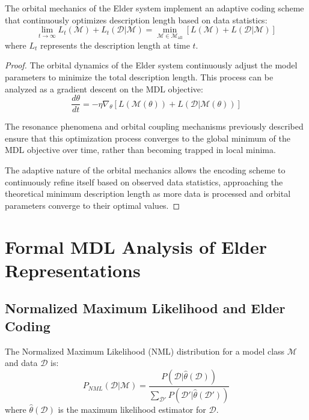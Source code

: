 \begin{theorem}
The orbital mechanics of the Elder system implement an adaptive coding scheme that continuously optimizes description length based on data statistics:
\begin{equation}
\lim_{t \to \infty} L_t(\mathcal{M}) + L_t(\mathcal{D} | \mathcal{M}) = \min_{\mathcal{M} \in \mathcal{M}_{\text{all}}} [L(\mathcal{M}) + L(\mathcal{D} | \mathcal{M})]
\end{equation}
where $L_t$ represents the description length at time $t$.
\end{theorem}

\begin{proof}
The orbital dynamics of the Elder system continuously adjust the model parameters to minimize the total description length. This process can be analyzed as a gradient descent on the MDL objective:
\begin{equation}
\frac{d\theta}{dt} = -\eta \nabla_\theta [L(\mathcal{M}(\theta)) + L(\mathcal{D} | \mathcal{M}(\theta))]
\end{equation}

The resonance phenomena and orbital coupling mechanisms previously described ensure that this optimization process converges to the global minimum of the MDL objective over time, rather than becoming trapped in local minima.

The adaptive nature of the orbital mechanics allows the encoding scheme to continuously refine itself based on observed data statistics, approaching the theoretical minimum description length as more data is processed and orbital parameters converge to their optimal values.
\end{proof}

\section{Formal MDL Analysis of Elder Representations}

\subsection{Normalized Maximum Likelihood and Elder Coding}

\begin{definition}
The Normalized Maximum Likelihood (NML) distribution for a model class $\mathcal{M}$ and data $\mathcal{D}$ is:
\begin{equation}
P_{NML}(\mathcal{D} | \mathcal{M}) = \frac{P(\mathcal{D} | \hat{\theta}(\mathcal{D}))}{\sum_{\mathcal{D}'} P(\mathcal{D}' | \hat{\theta}(\mathcal{D}'))}
\end{equation}
where $\hat{\theta}(\mathcal{D})$ is the maximum likelihood estimator for $\mathcal{D}$.
\end{definition}

